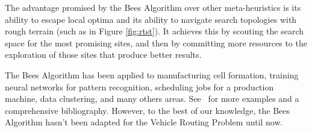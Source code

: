 The advantage promised by the Bees Algorithm over other meta-heuristics is its ability to escape local optima and its ability to navigate search topologies with rough terrain (such as in Figure \ref{fig:rtst}). It achieves this by scouting the search space for the most promising sites, and then by committing more resources to the exploration of those sites that produce better results.


The Bees Algorithm has been applied to manufacturing cell formation, training neural networks for pattern recognition, scheduling jobs for a production machine, data clustering, and many others areas. See~\cite{beesalg} for more examples and a comprehensive bibliography. However, to the best of our knowledge, the Bees Algorithm hasn't been adapted for the Vehicle Routing Problem until now.
